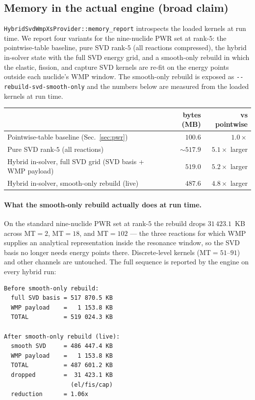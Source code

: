 \subsection{Memory in the actual engine (broad claim)}
\label{sec:hybrid_mem_engine}

\texttt{HybridSvdWmpXsProvider::memory\_report} introspects
the loaded kernels at run time. We report four variants for
the nine-nuclide PWR set at rank-$5$: the pointwise-table
baseline, pure SVD rank-$5$ (all reactions compressed), the
hybrid in-solver state with the full SVD energy grid, and a
smooth-only rebuild in which the elastic, fission, and
capture SVD kernels are re-fit on the energy points outside
each nuclide's WMP window. The smooth-only rebuild is
exposed as \texttt{-{}-rebuild-svd-smooth-only} and the
numbers below are measured from the loaded kernels at run
time.

\begin{center}
\small
\begin{tabular}{@{}p{}rr@{}}
\toprule
 & bytes (MB) & vs pointwise \\
\midrule
Pointwise-table baseline (Sec.~\ref{sec:pwr}) & $100.6$ & $1.0\times$ \\
Pure SVD rank-$5$ (all reactions) & $\sim\!517.9$ & $5.1\times$ larger \\
Hybrid in-solver, full SVD grid (SVD basis + WMP payload) & $519.0$ & $5.2\times$ larger \\
Hybrid in-solver, smooth-only rebuild (live) & $487.6$ & $4.8\times$ larger \\
\bottomrule
\end{tabular}
\end{center}

\paragraph{What the smooth-only rebuild actually does at run time.}
On the standard nine-nuclide PWR set at rank-$5$ the rebuild
drops $31\,423.1$~KB across MT$=2$, MT$=18$, and MT$=102$ ---
the three reactions for which WMP supplies an analytical
representation inside the resonance window, so the SVD basis
no longer needs energy points there. Discrete-level kernels
(MT$=51$--$91$) and other channels are untouched. The full
sequence is reported by the engine on every hybrid run:

\begin{verbatim}
Before smooth-only rebuild:
  full SVD basis = 517 870.5 KB
  WMP payload    =   1 153.8 KB
  TOTAL          = 519 024.3 KB

After smooth-only rebuild (live):
  smooth SVD     = 486 447.4 KB
  WMP payload    =   1 153.8 KB
  TOTAL          = 487 601.2 KB
  dropped        =  31 423.1 KB
                   (el/fis/cap)
  reduction      = 1.06x
\end{verbatim}

